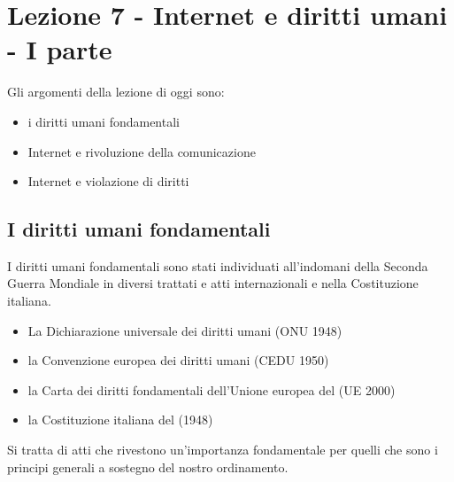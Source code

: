 \chapter{Lezione 7 - Internet e diritti umani - I parte}

Gli argomenti della lezione di oggi sono:
\begin{itemize}
    \item i diritti umani fondamentali  
    \item Internet e rivoluzione della comunicazione 
    \item Internet e violazione di diritti
\end{itemize}

\section{I diritti umani fondamentali}
I diritti umani fondamentali sono stati individuati all'indomani della Seconda Guerra Mondiale in diversi trattati e atti internazionali e nella Costituzione italiana. 
\begin{itemize}
    \item La Dichiarazione universale dei diritti umani (ONU 1948) 
    \item la Convenzione europea dei diritti umani (CEDU 1950) 
    \item la Carta dei diritti fondamentali dell'Unione europea del (UE 2000)
    \item la Costituzione italiana del (1948)
\end{itemize}

Si tratta di atti che rivestono un'importanza fondamentale per quelli che sono i principi generali a sostegno del nostro ordinamento. \par

